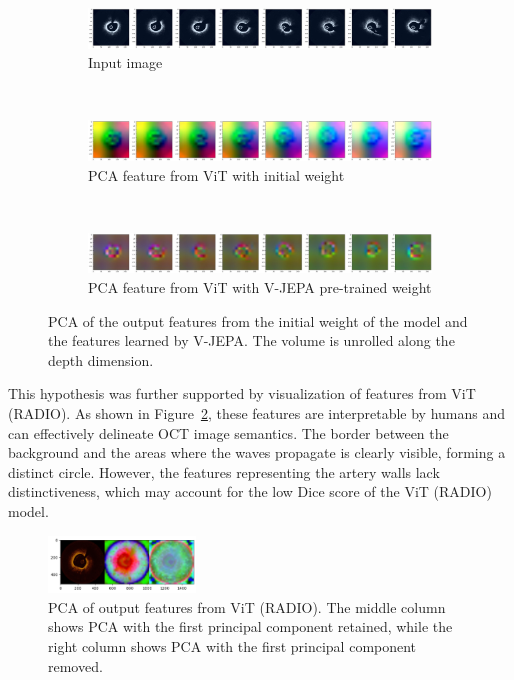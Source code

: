 \documentclass[a4paper,11pt,oneside]{report}
\begin{document}
\begin{figure}[hbt]
    \centering
    \begin{subfigure}[t]{0.8\textwidth}
        \centering
        \includegraphics[width=0.9\linewidth]{figures/discussion_visual_vjepa_input.jpg}
        \caption{Input image}
    \end{subfigure}\\
    \begin{subfigure}[t]{0.8\textwidth}
        \centering
        \includegraphics[width=0.9\linewidth]{figures/discussion_visual_vjepa_initial.jpg}
        \caption{PCA feature from ViT with initial weight}
    \end{subfigure}\\
    \begin{subfigure}[t]{0.8\textwidth}
        \centering
        \includegraphics[width=0.9\linewidth]{figures/discussion_visual_vjepa_pretrained.jpg}
        \caption{PCA feature from ViT with V-JEPA pre-trained weight}
    \end{subfigure}
    \caption{PCA of the output features from the initial weight of the model and the features learned by V-JEPA. The volume is unrolled along the depth dimension.}
    \label{fig:visually-good-features}
\end{figure}

This hypothesis was further supported by visualization of features from ViT (RADIO). As shown in Figure~\ref{fig:radio-features}, these features are interpretable by humans and can effectively delineate OCT image semantics. The border between the background and the areas where the waves propagate is clearly visible, forming a distinct circle. However, the features representing the artery walls lack distinctiveness, which may account for the low Dice score of the ViT (RADIO) model.

\begin{figure}[hbt]
    \centering
    \includegraphics[width=0.35\textwidth]{figures/discussion_radio_feature.png}
    \caption{PCA of output features from ViT (RADIO). The middle column shows PCA with the first principal component retained, while the right column shows PCA with the first principal component removed.}
    \label{fig:radio-features}
\end{figure}
\end{document}
